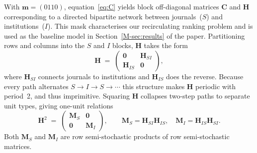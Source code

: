 With $\mathbf{m}=(0110)$, equation~\eqref{eq:C} yields block off-diagonal matrices $\mathbf{C}$ and $\mathbf{H}$ corresponding to a directed bipartite network between journals~($S$) and institutions~($I$). This mask characterises our recirculating ranking problem and is used as the baseline model in Section~\ref{M-sec:results} of the paper.
Partitioning rows and columns into the $S$ and $I$ blocks, $\mathbf{H}$ takes the form
\begin{equation}
  \mathbf{H}
  \;=\;
  \begin{pmatrix} \mathbf{0} & \mathbf{H}_{SI} \\ \mathbf{H}_{IS} & \mathbf{0} \end{pmatrix},
  \label{eq:H_bipartite}
\end{equation}
where $\mathbf{H}_{SI}$ connects journals to institutions and $\mathbf{H}_{IS}$ does the reverse.
Because every path alternates $S\to I\to S\to\cdots$ this structure makes $\mathbf{H}$ periodic with period~2, and thus imprimitive.
Squaring $\mathbf{H}$ collapses two-step paths to separate unit types, giving one-unit relations
\[
  \mathbf{H}^2
  \;=\;
  \begin{pmatrix} \mathbf{M}_S & \mathbf{0} \\ \mathbf{0} & \mathbf{M}_I \end{pmatrix},
  \qquad
  \mathbf{M}_S = \mathbf{H}_{SI}\mathbf{H}_{IS},
  \quad
  \mathbf{M}_I = \mathbf{H}_{IS}\mathbf{H}_{SI}.
\]
Both $\mathbf{M}_S$ and $\mathbf{M}_I$ are row semi-stochastic products of row semi-stochastic matrices.

